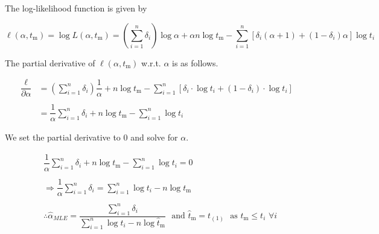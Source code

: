 \documentclass[12pt, a4paper, onecolumn, answers]{exam}
\begin{document}
\begin{questions}
\begin{solution}
The log-likelihood function is given by

\[
\ell(\alpha, t_{\mathrm{m}})  = \log L(\alpha, t_{\mathrm{m}}) 
= \left( \sum_{i=1}^n \delta_i \right) \log \alpha 
+ \alpha n \log t_{\mathrm{m}} 
- \sum_{i=1}^n \left[ \delta_i (\alpha + 1) + (1 - \delta_i)\alpha \right] \log t_i
\]

The partial derivative of $\ell(\alpha, t_\mathrm{m})$ w.r.t. $\alpha$ is as follows.

\begin{align*}
\dfrac{\ell}{\partial \alpha}
&= \left( \sum_{i=1}^n \delta_i \right) \dfrac{1}{\alpha} 
+ n \log t_{\mathrm{m}} 
- \sum_{i=1}^n \left[ \delta_i \cdot \log t_i + (1 - \delta_i) \cdot \log t_i \right] \\
\\
&= \dfrac{1}{\alpha} \sum \limits_{i=1}^n \delta_i
+ n \log t_{\mathrm{m}} 
- \sum_{i=1}^n \log t_i
\end{align*}


We set the partial derivative to 0 and solve for $\alpha$.

\begin{align*}
&\dfrac{1}{\alpha} \sum \limits_{i=1}^n \delta_i
+ n \log t_{\mathrm{m}} 
- \sum_{i=1}^n \log t_i = 0 \\
\\
&\Rightarrow \dfrac{1}{\alpha} \sum \limits_{i=1}^n \delta_i
= \sum_{i=1}^n \log t_i - n \log t_{\mathrm{m}} \\
\\
&\therefore \hat{\alpha}_{MLE}
   = \dfrac{\sum \limits_{i=1}^n \delta_i}{\sum \limits_{i=1}^n \log t_i - n \log \hat{t}_{\mathrm{m}}} \,\,\,\, \text{and } \hat{t}_{\mathrm{m}} = t_{(1)} \,\,\,\, \text{as } {t}_{\mathrm{m}} \leq t_i \,\, \forall i
\end{align*}

\end{solution}    
\end{questions}
\end{document}
